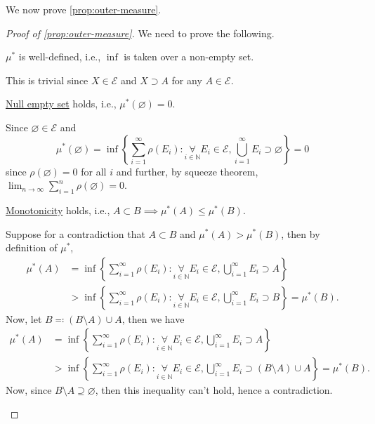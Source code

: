 We now prove \autoref{prop:outer-measure}.
\begin{proof}[Proof of \autoref{prop:outer-measure}]
	We need to prove the following.

	\begin{claim}
		\(\mu ^{\ast} \) is well-defined, i.e., \(\inf\) is taken over a non-empty set.
	\end{claim}
	\begin{explanation}
		This is trivial since \(X\in \mathcal{E}\) and \(X\supset A\) for any \(A\in \mathcal{E}\).
	\end{explanation}

	\begin{claim}
		\hyperref[def:outer-measure-null-empty-set]{Null empty set} holds, i.e., \(\mu ^{\ast} (\varnothing ) = 0\).
	\end{claim}
	\begin{explanation}
		Since \(\varnothing \in \mathcal{E}\) and
		\[
			\mu^{\ast} (\varnothing ) = \inf \left\{\sum_{i=1}^{\infty} \rho(E_{i})\colon \underset{i\in \mathbb{N} }{\forall}E_{i}\in \mathcal{E} , \bigcup_{i=1}^{\infty} E_{i}\supset \varnothing \right\} = 0
		\]
		since \(\rho(\varnothing ) = 0\) for all \(i\) and further, by squeeze theorem, \(\lim_{n \to \infty} \sum_{i=1}^{n} \rho(\varnothing) = 0\).
	\end{explanation}

	\begin{claim}
		\hyperref[def:outer-measure-montonicity]{Monotonicity} holds, i.e., \(A\subset B\implies \mu^{\ast} (A)\leq \mu^{\ast} (B)\).
	\end{claim}
	\begin{explanation}
		Suppose for a contradiction that \(A\subset B\) and \(\mu^{\ast} (A)>  \mu^{\ast} (B)\), then by definition of \(\mu^{\ast} \),
		\[
			\begin{split}
				\mu^{\ast} (A)
				 & = \inf\left\{\sum_{i=1}^{\infty} \rho(E_{i})\colon \underset{i\in\mathbb{N}}{\forall}E_{i}\in \mathcal{E},\bigcup_{i=1}^{\infty} E_{i}\supset A \right\} \\
				 & >\inf\left\{\sum_{i=1}^{\infty} \rho(E_{i})\colon \underset{i\in\mathbb{N}}{\forall}E_{i}\in \mathcal{E},\bigcup_{i=1}^{\infty} E_{i}\supset B \right\}
				= \mu^{\ast} (B).
			\end{split}
		\]
		Now, let \(B \eqqcolon (B\setminus A)\cup A\), then we have
		\[
			\begin{split}
				\mu^{\ast} (A)
				 & = \inf\left\{\sum_{i=1}^{\infty} \rho(E_{i})\colon \underset{i\in\mathbb{N}}{\forall}E_{i}\in \mathcal{E},\bigcup_{i=1}^{\infty} E_{i}\supset A \right\}                   \\
				 & >\inf\left\{\sum_{i=1}^{\infty} \rho(E_{i})\colon \underset{i\in\mathbb{N}}{\forall}E_{i}\in \mathcal{E},\bigcup_{i=1}^{\infty} E_{i}\supset (B\setminus A)\cup A \right\}
				= \mu^{\ast} (B).
			\end{split}
		\]
		Now, since \(B\setminus A\supseteq \varnothing \), then this inequality can't hold, hence a contradiction.
	\end{explanation}


\end{proof}
